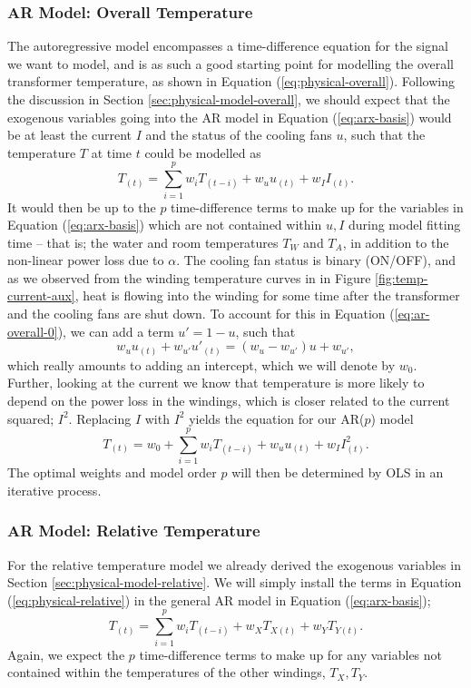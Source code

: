 \documentclass[]{article}
\begin{document}
\subsubsection{AR Model: Overall Temperature} \label{sec:ar-model-overall}
The autoregressive model encompasses a time-difference equation for the signal we want to model, and is as such a good starting point for modelling the overall transformer temperature, as shown in Equation (\ref{eq:physical-overall}). Following the discussion in Section \ref{sec:physical-model-overall}, we should expect that the exogenous variables going into the AR model in Equation (\ref{eq:arx-basis}) would be at least the current $I$ and the status of the cooling fans $u$, such that the temperature $T$ at time $t$ could be modelled as
\begin{equation} \label{eq:ar-overall-0}
	T_{(t)} = \sum_{i=1}^{p} w_i T_{(t-i)} + w_u u_{(t)} + w_{I} I_{(t)}.
\end{equation}
It would then be up to the $p$ time-difference terms to make up for the variables in Equation (\ref{eq:arx-basis}) which are not contained within $u,I$ during model fitting time -- that is; the water and room temperatures $T_W$ and $T_A$, in addition to the non-linear power loss due to $\alpha$. The cooling fan status is binary (ON/OFF), and as we observed from the winding temperature curves in in Figure \ref{fig:temp-current-aux}, heat is flowing into the winding for some time after the transformer and the cooling fans are shut down. To account for this in Equation (\ref{eq:ar-overall-0}), we can add a term $u' = 1 - u$, such that
\begin{equation}
	w_u u_{(t)} + w_{u'} u'_{(t)} = (w_u - w_{u'})u + w_{u'},
\end{equation}
which really amounts to adding an intercept, which we will denote by $w_0$. Further, looking at the current we know that temperature is more likely to depend on the power loss in the windings, which is closer related to the current squared; $I^2$. Replacing $I$ with $I^2$ yields the equation for our AR($p$) model
\begin{equation} \label{eq:ar-overall-1}
	T_{(t)} = w_0 + \sum_{i=1}^{p} w_i T_{(t-i)} + w_u u_{(t)} + w_{I} I^2_{(t)}.
\end{equation}
The optimal weights and model order $p$ will then be determined by OLS in an iterative process.

\subsubsection{AR Model: Relative Temperature} \label{sec:ar-model-relative}
For the relative temperature model we already derived the exogenous variables in Section \ref{sec:physical-model-relative}. We will simply install the terms in Equation (\ref{eq:physical-relative}) in the general AR model in Equation (\ref{eq:arx-basis});
\begin{equation} \label{eq:ar-relative}
	T_{(t)} = \sum_{i=1}^{p} w_i T_{(t-i)} + w_X T_{X(t)} + w_Y T_{Y(t)}.
\end{equation}
Again, we expect the $p$ time-difference terms to make up for any variables not contained within the temperatures of the other windings, $T_X, T_Y$.
\end{document}
